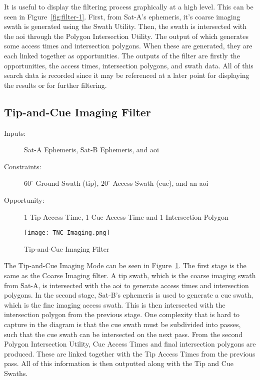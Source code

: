 It is useful to display the filtering process graphically at a high level.
This can be seen in Figure~\ref{fig:filter-1}. First, from Sat-A's ephemeris,
it's coarse imaging swath is generated using the Swath Utility. Then, the swath
is intersected with the \gls{aoi} through the Polygon Intersection Utility. The
output of which generates some access times and intersection polygons. When
these are generated, they are each linked together as opportunities. The
outputs of the filter are firstly the opportunities, the access times,
intersection polygons, and swath data. All of this search data is recorded
since it may be referenced at a later point for displaying the results or for
further filtering.

\subsection{Tip-and-Cue Imaging Filter}

\begin{description} 

    \item[Inputs:]  Sat-A Ephemeris, Sat-B Ephemeris, and  \gls{aoi}

    \item[Constraints:] $60^\circ$ Ground Swath (tip), $20^\circ$ Access Swath (cue), and an \gls{aoi}

    \item[Opportunity:] 1 Tip Access Time, 1 Cue Access Time and 1 Intersection Polygon

\end{description} 

\begin{figure}[h]
    \centering
    \texttt{[image: TNC Imaging.png]} 
    \caption{Tip-and-Cue Imaging Filter}
    \label{fig:filter-2} 
\end{figure}


The Tip-and-Cue Imaging Mode can be seen in Figure~\ref{fig:filter-2}. The
first stage is the same as the Coarse Imaging filter. A tip swath, which is the
coarse imaging swath from Sat-A, is intersected with the \gls{aoi} to generate
access times and intersection polygons. In the second stage, Sat-B's ephemeris
is used to generate a cue swath, which is the fine imaging access swath. This
is then intersected with the intersection polygon from the previous stage. One
complexity that is hard to capture in the diagram is that the cue swath must be
subdivided into passes, such that the cue swath can be intersected on the next
pass. From the second Polygon Intersection Utility, Cue Access Times and final
intersection polygons are produced. These are linked together with the Tip
Access Times from the previous pass. All of this information is then outputted
along with the Tip and Cue Swaths.

